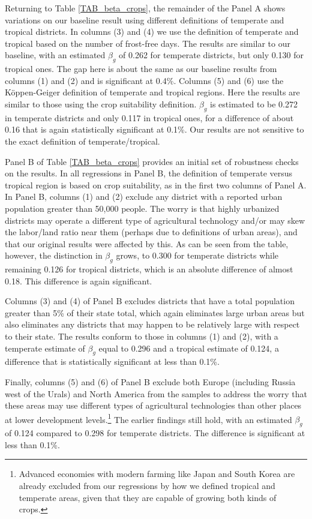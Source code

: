 \documentclass[12pt]{article}
\begin{document}
Returning to Table \ref{TAB_beta_crops}, the remainder of the Panel A shows variations on our baseline result using different definitions of temperate and tropical districts. In columns (3) and (4) we use the definition of temperate and tropical based on the number of frost-free days. The results are similar to our baseline, with an estimated $\beta_g$ of 0.262 for temperate districts, but only 0.130 for tropical ones. The gap here is about the same as our baseline results from columns (1) and (2) and is significant at 0.4\%. Columns (5) and (6) use the K{\"o}ppen-Geiger definition of temperate and tropical regions. Here the results are similar to those using the crop suitability definition. $\beta_g$ is estimated to be 0.272 in temperate districts and only 0.117 in tropical ones, for a difference of about 0.16 that is again statistically significant at 0.1\%. Our results are not sensitive to the exact definition of temperate/tropical.

Panel B of Table \ref{TAB_beta_crops} provides an initial set of robustness checks on the results. In all regressions in Panel B, the definition of temperate versus tropical region is based on crop suitability, as in the first two columns of Panel A. In Panel B, columns (1) and (2) exclude any district with a reported urban population greater than 50,000 people. The worry is that highly urbanized districts may operate a different type of agricultural technology and/or may skew the labor/land ratio near them (perhaps due to definitions of urban areas), and that our original results were affected by this. As can be seen from the table, however, the distinction in $\beta_g$ grows, to 0.300 for temperate districts while remaining 0.126 for tropical districts, which is an absolute difference of almost 0.18. This difference is again significant.

Columns (3) and (4) of Panel B excludes districts that have a total population greater than 5\% of their state total, which again eliminates large urban areas but also eliminates any districts that may happen to be relatively large with respect to their state. The results conform to those in columns (1) and (2), with a temperate estimate of $\beta_g$ equal to 0.296 and a tropical estimate of 0.124, a difference that is statistically significant at less than 0.1\%.

Finally, columns (5) and (6) of Panel B exclude both Europe (including Russia west of the Urals) and North America from the samples to address the worry that these areas may use different types of agricultural technologies than other places at lower development levels.\footnote{Advanced economies with modern farming like Japan and South Korea are already excluded from our regressions by how we defined tropical and temperate areas, given that they are capable of growing both kinds of crops.} The earlier findings still hold, with an estimated $\beta_g$ of 0.124 compared to 0.298 for temperate districts. The difference is significant at less than 0.1\%.
\end{document}
